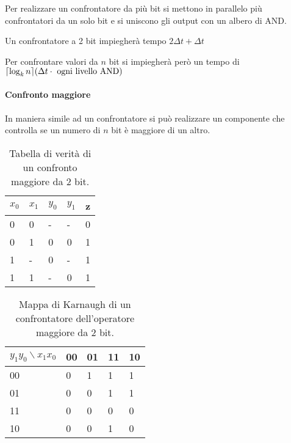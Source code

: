
Per realizzare un confrontatore da più bit si mettono in parallelo più confrontatori da un solo bit e si uniscono gli output con un albero di AND.

Un confrontatore a 2 bit impiegherà tempo $ 2\Delta t + \Delta t $

Per confrontare valori da $ n $ bit si impiegherà però un tempo di $ \lceil\log_kn\rceil(\Delta t \cdot \text{ ogni livello AND})$

\paragraph{Confronto maggiore}
In maniera simile ad un confrontatore si può realizzare un componente che controlla se un numero di $ n $ bit è maggiore di un altro.

\begin{table}[H]
	\centering
	\caption{Tabella di verità di un confronto maggiore da 2 bit.}
	\label{tab:2bitgreater}
	\begin{tabular}{|ll|ll|l|}
		\hline
		$ x_0 $ & $ x_1 $ & $ y_0 $ & $ y_1 $ & z \\ \hline
		0       & 0       & -       & -       & 0 \\
		0       & 1       & 0       & 0       & 1 \\
		1       & -       & 0       & -       & 1 \\
		1       & 1       & -       & 0       & 1 \\ \hline
	\end{tabular}
\end{table}

\begin{table}[H]
	\centering
	\caption{Mappa di Karnaugh di un confrontatore dell'operatore maggiore da 2 bit.}
	\label{tab:2bitgreater}
	\begin{tabular}{|l|llll|}
		\hline
		$ y_1y_0 \backslash x_1x_0 $ & 00 & 01 & 11                        & 10                        \\ \hline
		00                         & 0  & 1  & \cellcolor[HTML]{FFCCC9}1 & \cellcolor[HTML]{FFCCC9}1 \\
		01                         & 0  & 0  & \cellcolor[HTML]{FFCCC9}1 & \cellcolor[HTML]{FFCCC9}1 \\
		11                         & 0  & 0  & 0                         & 0                         \\
		10                         & 0  & 0  & 1                         & 0                         \\ \hline
	\end{tabular}
\end{table}

